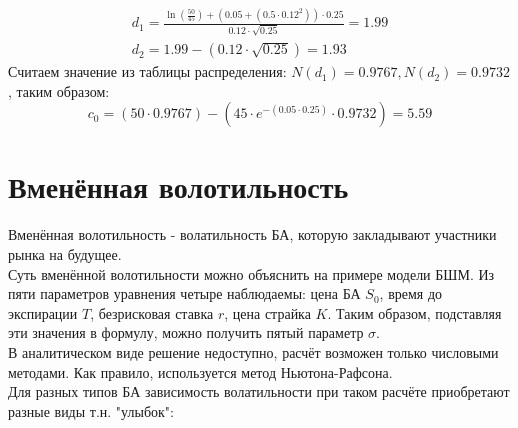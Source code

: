\documentclass{article}
\begin{document}
$$
\begin{gathered}
d_1=\frac{\ln \left(\frac{50}{45}\right)+\left(0.05+\left(0.5 \cdot 0.12^2\right)\right) \cdot 0.25}{0.12 \cdot \sqrt{0.25}}=1.99 \\
d_2=1.99-(0.12 \cdot \sqrt{0.25})=1.93
\end{gathered}
$$
Считаем значение из таблицы распределения: $N\left(d_1\right)=0.9767, N\left(d_2\right)=0.9732$, таким образом:
$$
c_0=(50 \cdot 0.9767)-\left(45 \cdot e^{-(0.05 \cdot 0.25)} \cdot 0.9732\right)=5.59
$$

\section{Вменённая волотильность}
Вменённая волотильность - волатильность БА, которую закладывают участники рынка на будущее.\\
Суть вменённой волотильности можно объяснить на примере модели БШМ. Из пяти параметров уравнения четыре наблюдаемы: цена БА $S_0$, время до экспирации $T$, безрисковая ставка $r$, цена страйка $K$. Таким образом, подставляя эти значения в формулу, можно получить пятый параметр $\sigma$.\\
В аналитическом виде решение недоступно, расчёт возможен только числовыми методами. Как правило, используется метод Ньютона-Рафсона.\\
Для разных типов БА зависимость волатильности при таком расчёте приобретают разные виды т.н. "улыбок":
\end{document}
